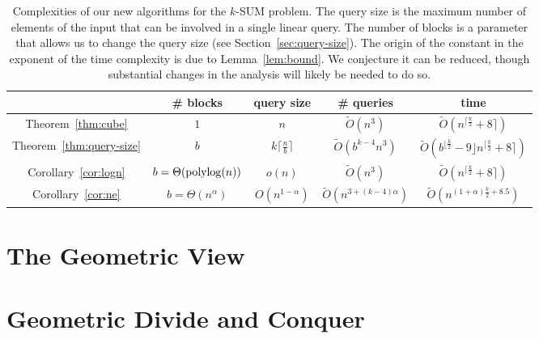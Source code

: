 \begin{table}
\centering
\caption{Complexities of our new algorithms for the \(k\)-SUM problem. The query
size is the maximum number of elements of the input that can be involved in a
single linear query. The number of blocks is a parameter that allows us to
change the query size (see Section~\ref{sec:query-size}).
The origin of the constant in the exponent of the time complexity is due to
Lemma~\ref{lem:bound}. We conjecture it can be reduced, though substantial
changes in the analysis will likely be needed to do so.}
\label{tab:results}
\begin{tabular}{|c|c|c|c|c|}
	\hline

	& \# blocks & query size & \# queries & time \\
	\hline
	Theorem~\ref{thm:cube} &
	$1$ &
	$n$ &
	$\tilde{O}(n^3)$ & $\tilde{O}(n^{\lceil\frac{k}{2}}+8\rceil)$
	\\

	\hline

	Theorem~\ref{thm:query-size} &
	$b$ &
	$k\lceil\frac{n}{b}\rceil$ &
	$\tilde{O}(b^{k-4}n^3)$ &
	$\tilde{O}(b^{\lfloor\frac{k}{2}}-9\rfloor n^{\lceil\frac{k}{2}}+8\rceil)$
	\\

	\hline

	Corollary~\ref{cor:logn} &
	$b=\Theta(\operatorname{polylog}(n))$ &
	$o(n)$ &
	$\tilde{O}(n^3)$ &
	$\tilde{O}(n^{\lceil\frac{k}{2}}+8\rceil)$
	\\

	\hline

	Corollary~\ref{cor:ne} &
	$b=\Theta(n^\alpha)$ &
	$O(n^{1-\alpha})$ &
	$\tilde{O}(n^{3+(k-4)\alpha})$ &
	$\tilde{O}(n^{(1+\alpha)\frac{k}{2} +8.5})$
	\\

	\hline
\end{tabular}
\end{table}

\chapter{The Geometric View}

\chapter{Geometric Divide and Conquer}
